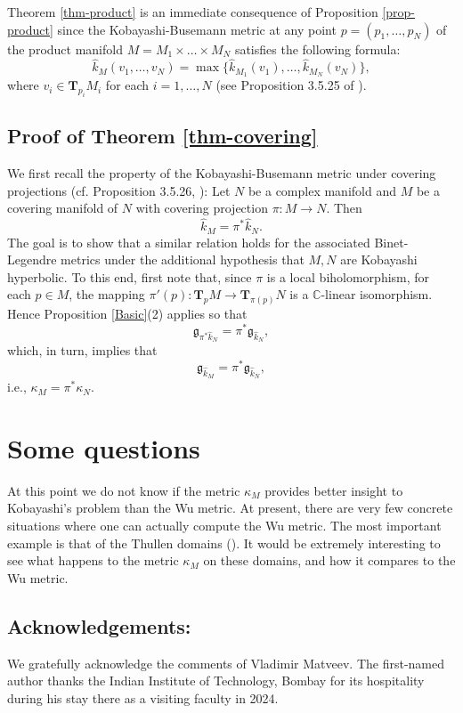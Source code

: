 \documentclass[a4paper,11pt,reqno]{amsart}
\theoremstyle{plain}
\theoremstyle{definition}
\theoremstyle{remark}
\theoremstyle{remark}
\numberwithin{equation}{section}
\begin{document}
Theorem \ref{thm-product} is an immediate consequence of Proposition \ref{prop-product} since the Kobayashi-Busemann metric at any point $ p = (p_1, \dots, p_N) $ of the product manifold $M=M_1\times  \dots \times M_N$ satisfies the following formula:
\[
\hat{k}_{M} (v_1, \dots, v_N) = 
\max \{ \hat{k}_{M_1} (v_1), \dots, \hat{k}_{M_N} (v_N)\},
\]
where $ v_i \in \mathbf{T}_{p_i}M_i $ for each $ i = 1, \dots, N $ (see Proposition 3.5.25 of \cite{kobayashifat}).

\subsection{Proof of Theorem \ref{thm-covering}}

We first recall the property of the Kobayashi-Busemann metric under covering projections (cf. Proposition 3.5.26, \cite{kobayashifat}): Let $ N $ be a complex manifold and $ M $ be a covering manifold of $ N $ with covering projection $ \pi: M \rightarrow N $. Then 
\[
\hat{k}_M = \pi^* \hat{k}_N.
\]
The goal is to show that a similar relation holds for the associated Binet-Legendre metrics under the additional hypothesis that $ M, N  $ are Kobayashi hyperbolic. To this end, first note that, since $ \pi $ is a local biholomorphism, for each $ p \in M $, the mapping $ \pi'(p): \textbf{T}_p M \rightarrow \textbf{T}_{ \pi(p)} N $ is a $ \mathbb{C} $-linear isomorphism. Hence Proposition \ref{Basic}\;(2) applies so that 
\[
\mathfrak{g}_{\pi^* \hat{k}_N} = \pi^*\mathfrak{g}_{ \hat{k}_N}, 
\]
which, in turn, implies that
\[
\mathfrak{g}_{\hat{k}_M} = \pi^*\mathfrak{g}_{ \hat{k}_N}, 
\]
i.e., $ \kappa_M = \pi^* {\kappa_N} $.
\section{Some questions}
At this point we do not know if the metric $\kappa_M$ provides
better insight to Kobayashi's problem than the Wu metric. At present, 
there are very few concrete situations where one can actually compute the Wu metric. The most important example is that of the Thullen domains (\cite{cheungkim1,cheunkim2,cheungkimconstant, balaprachiwu1,balaprachiwu2}). It would be extremely interesting to see what happens to the metric $\kappa_M$ on these domains, and how it compares to the Wu metric. 

\subsection*{Acknowledgements:} We gratefully acknowledge the comments of Vladimir Matveev. The first-named author thanks
the Indian Institute of Technology, Bombay for its hospitality during 
his stay there as a visiting faculty in 2024.


\end{document}
